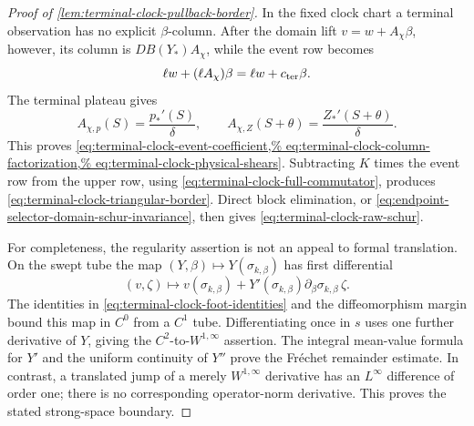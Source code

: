 \begin{proof}[Proof of
\cref{lem:terminal-clock-pullback-border}]
In the fixed clock chart a terminal observation has no explicit
\(\beta\)-column.  After the domain lift \(v=w+A_\chi\beta\), however, its
column is \(DB(Y_*)A_\chi\), while the event row becomes
\[
 \ell w+(\ell A_\chi)\beta=\ell w+c_{\rm ter}\beta.
\]
The terminal plateau gives
\[
 A_{\chi,p}(S)=\frac{p_*'(S)}{\delta},\qquad
 A_{\chi,Z}(S+\theta)=\frac{Z_*'(S+\theta)}{\delta}.
\]
This proves
\cref{eq:terminal-clock-event-coefficient,%
eq:terminal-clock-column-factorization,%
eq:terminal-clock-physical-shears}.  Subtracting \(K\) times the event
row from the upper row, using
\cref{eq:terminal-clock-full-commutator}, produces
\cref{eq:terminal-clock-triangular-border}.  Direct block elimination,
or \cref{eq:endpoint-selector-domain-schur-invariance}, then gives
\cref{eq:terminal-clock-raw-schur}.

For completeness, the regularity assertion is not an appeal to formal
translation.  On the swept tube the map
\((Y,\beta)\mapsto Y(\sigma_{k,\beta})\) has first differential
\[
 (v,\zeta)\longmapsto
 v(\sigma_{k,\beta})
 +Y'(\sigma_{k,\beta})
       \partial_\beta\sigma_{k,\beta}\,\zeta.
\]
The identities in \cref{eq:terminal-clock-foot-identities} and the
diffeomorphism margin bound this map in \(C^0\) from a \(C^1\) tube.
Differentiating once in \(s\) uses one further derivative of \(Y\), giving
the \(C^2\)-to-\(W^{1,\infty}\) assertion.  The integral mean-value formula
for \(Y'\) and the uniform continuity of \(Y''\) prove the Fr\'echet
remainder estimate.  In contrast, a translated jump of a merely
\(W^{1,\infty}\) derivative has an \(L^\infty\) difference of order one;
there is no corresponding operator-norm derivative.  This proves the
stated strong-space boundary.
\end{proof}

